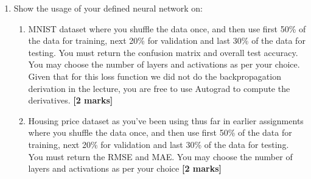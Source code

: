 \documentclass[colorlinks,linkcolor=true]{article}
\begin{document}
\begin{enumerate}
\begin{enumerate}
\begin{enumerate}
\end{enumerate}

\item Show the usage of your defined neural network on:
\begin{enumerate}
	\item MNIST dataset where you shuffle the data once, and then use first 50\% of the data for training, next 20\% for validation and last 30\% of the data for testing. You must return the confusion matrix and overall test accuracy. You may choose the number of layers and activations as per your choice. Given that for this loss function we did not do the backpropagation derivation in the lecture, you are free to use Autograd to compute the derivatives.  \textbf{[2 marks]}
	\item Housing price dataset as you've been using thus far in earlier assignments where you shuffle the data once, and then use first 50\% of the data for training, next 20\% for validation and last 30\% of the data for testing. You must return the RMSE and MAE. You may choose the number of layers and activations as per your choice \textbf{[2 marks]}
\end{enumerate}
\end{enumerate}
\end{enumerate}



	
\end{document}
